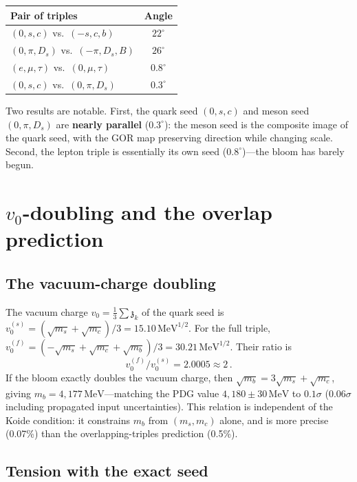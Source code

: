 \documentclass[12pt,a4paper]{article}
\newcommand{\MeV}{\,\text{MeV}}
\newcommand{\zch}{\mathfrak{z}}
\begin{document}
\begin{center}
\begin{tabular}{lc}
\toprule
Pair of triples & Angle \\
\midrule
$(0,s,c)$ vs.\ $(-s,c,b)$ & $22^\circ$ \\
$(0,\pi,D_s)$ vs.\ $(-\pi,D_s,B)$ & $26^\circ$ \\
$(e,\mu,\tau)$ vs.\ $(0,\mu,\tau)$ & $0.8^\circ$ \\
$(0,s,c)$ vs.\ $(0,\pi,D_s)$ & $0.3^\circ$ \\
\bottomrule
\end{tabular}
\end{center}

Two results are notable. First, the quark seed $(0,s,c)$ and meson
seed $(0,\pi,D_s)$ are \textbf{nearly parallel} ($0.3^\circ$): the
meson seed is the composite image of the quark seed, with the GOR
map preserving direction while changing scale. Second, the lepton
triple is essentially its own seed ($0.8^\circ$)---the bloom has
barely begun.

\section{$v_0$-doubling and the overlap prediction}

\subsection{The vacuum-charge doubling}

The vacuum charge $v_0 = \tfrac{1}{3}\sum\zch_k$ of the quark seed
is $v_0^{(s)} = (\sqrt{m_s} + \sqrt{m_c})/3 = 15.10\MeV^{1/2}$.
For the full triple, $v_0^{(f)} = (-\sqrt{m_s} + \sqrt{m_c} +
\sqrt{m_b})/3 = 30.21\MeV^{1/2}$. Their ratio is
\begin{equation}
  v_0^{(f)}/v_0^{(s)} = 2.0005 \approx 2\,.
\end{equation}
If the bloom exactly doubles the vacuum charge, then
$\sqrt{m_b} = 3\sqrt{m_s} + \sqrt{m_c}$, giving
$m_b = 4{,}177\MeV$---matching the PDG value
$4{,}180 \pm 30\MeV$ to $0.1\sigma$ ($0.06\sigma$ including
propagated input uncertainties). This relation is
independent of the Koide condition: it constrains $m_b$ from
$(m_s, m_c)$ alone, and is more precise (0.07\%) than the
overlapping-triples prediction (0.5\%).

\subsection{Tension with the exact seed}
\end{document}
